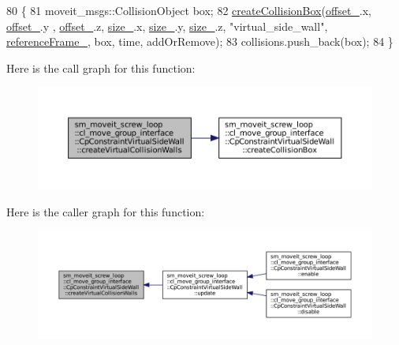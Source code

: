 \begin{DoxyCode}
80         \{
81             moveit\_msgs::CollisionObject box;
82             \hyperlink{classsm__moveit__screw__loop_1_1cl__move__group__interface_1_1CpConstraintVirtualSideWall_a4f5a69da36fc2a882d0b36466b72452b}{createCollisionBox}(\hyperlink{classsm__moveit__screw__loop_1_1cl__move__group__interface_1_1CpConstraintVirtualSideWall_a3ba336712454339510d0fb6804ff2a16}{offset\_}.x, \hyperlink{classsm__moveit__screw__loop_1_1cl__move__group__interface_1_1CpConstraintVirtualSideWall_a3ba336712454339510d0fb6804ff2a16}{offset\_}.y , 
      \hyperlink{classsm__moveit__screw__loop_1_1cl__move__group__interface_1_1CpConstraintVirtualSideWall_a3ba336712454339510d0fb6804ff2a16}{offset\_}.z, \hyperlink{classsm__moveit__screw__loop_1_1cl__move__group__interface_1_1CpConstraintVirtualSideWall_a8426348ea8e4b58a66677f971355a87b}{size\_}.x, \hyperlink{classsm__moveit__screw__loop_1_1cl__move__group__interface_1_1CpConstraintVirtualSideWall_a8426348ea8e4b58a66677f971355a87b}{size\_}.y, \hyperlink{classsm__moveit__screw__loop_1_1cl__move__group__interface_1_1CpConstraintVirtualSideWall_a8426348ea8e4b58a66677f971355a87b}{size\_}.z, \textcolor{stringliteral}{"virtual\_side\_wall"}, 
      \hyperlink{classsm__moveit__screw__loop_1_1cl__move__group__interface_1_1CpConstraintVirtualSideWall_a26e5b811c2b96eff63de1a0e8f6d7123}{referenceFrame\_}, box, time, addOrRemove);
83             collisions.push\_back(box);
84         \}
\end{DoxyCode}
Here is the call graph for this function\+:
\nopagebreak
\begin{figure}[H]
\begin{center}
\leavevmode
\includegraphics[width=350pt]{classsm__moveit__screw__loop_1_1cl__move__group__interface_1_1CpConstraintVirtualSideWall_afea3c873645eee21c6ab1d3b43f59c35_cgraph}
\end{center}
\end{figure}
Here is the caller graph for this function\+:
\nopagebreak
\begin{figure}[H]
\begin{center}
\leavevmode
\includegraphics[width=350pt]{classsm__moveit__screw__loop_1_1cl__move__group__interface_1_1CpConstraintVirtualSideWall_afea3c873645eee21c6ab1d3b43f59c35_icgraph}
\end{center}
\end{figure}
